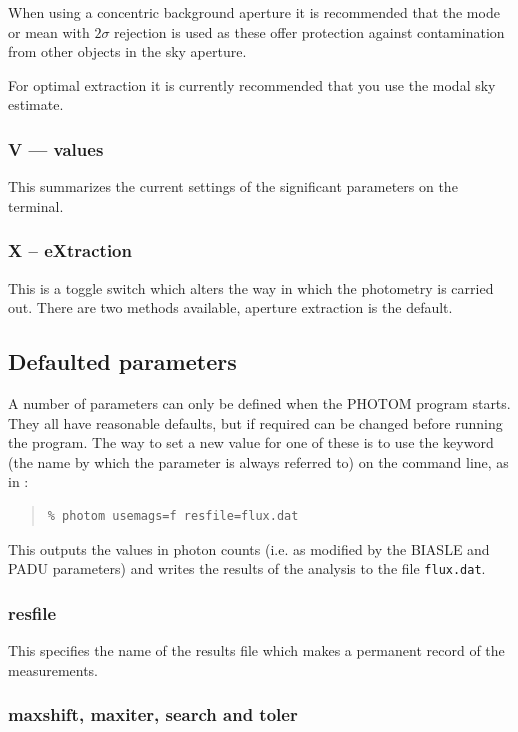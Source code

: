 \documentclass[twoside,11pt]{article}
\newcommand{\xlabel}[1]{}
\renewcommand{\_}{\texttt{\symbol{95}}}
\begin{document}
When using a concentric background aperture it is recommended that the
mode or mean with $2\sigma$ rejection is used as these offer protection
against contamination from other objects in the sky aperture.

For optimal extraction it is currently recommended that you use the modal
sky estimate.


\subsubsection{V --- values}

This summarizes the current settings of the significant parameters on
the terminal.

\subsubsection{X -- eXtraction}

This is a toggle switch which alters the way in which the photometry
is carried out. There are two methods available, aperture extraction is
the default.

\subsection{\xlabel{defaulted_parameters}Defaulted parameters}

A number of parameters can only be defined when the PHOTOM program
starts. They all have reasonable defaults, but if required can be
changed before running the program. The way to set a new value for one
of these is to use the keyword (the name by which the parameter is
always referred to) on the command line, as in :
\begin{quote}
\begin{verbatim}
% photom usemags=f resfile=flux.dat
\end{verbatim}
\end{quote}
This outputs the values in photon counts (i.e. as modified by the
BIASLE and PADU parameters) and writes the results of the analysis to
the file \texttt{flux.dat}.

\subsubsection{resfile}

This specifies the name of the results file which makes a permanent record
of the measurements.

\subsubsection{maxshift, maxiter, search and toler}
\end{document}
